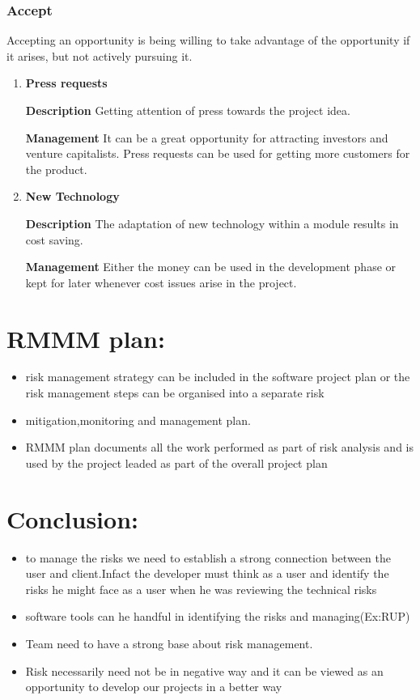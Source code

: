 \documentclass[12pt]{article}
\begin{document}
\subsubsection{Accept}
Accepting an opportunity is being willing to take advantage of the opportunity if it arises, but not actively pursuing it.
\begin{enumerate}
\item
\textbf{Press requests} 

\bigskip
\textbf{Description}
Getting attention of press towards the project idea.

\bigskip
\textbf{Management}
It can be a great opportunity for attracting investors and venture capitalists.
Press requests can be used for getting more customers for the 
product.
\item
\textbf{New Technology}

\bigskip
  \textbf{Description}
The adaptation of new technology within a module results in cost saving.

\bigskip
\textbf{Management}
Either the money can be used in the development phase or kept for later whenever cost issues arise in the project.
\end{enumerate}

\section{RMMM plan:}
\begin{itemize}
  \item  risk management strategy can be included in the software project plan or
the risk management steps can be organised into a separate risk
  \item mitigation,monitoring and management plan.
  \item RMMM plan documents all the work performed as part of risk analysis
and is used by the project leaded as part of the overall project plan
\end{itemize}
\section{Conclusion:}
\begin{itemize}
  \item  to manage the risks we need to establish a strong connection between the
user and client.Infact the developer must think as a user and identify the
risks he might face as a user when he was reviewing the technical risks
  \item software tools can he handful in identifying the risks and managing(Ex:RUP)
  \item Team need to have a strong base about risk management.
  \item Risk necessarily need not be in negative way and it can be viewed as an
opportunity to develop our projects in a better way
\end{itemize}
\end{document}
